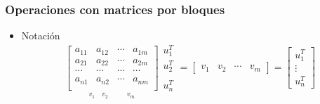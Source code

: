\subsubsection{Operaciones con matrices por bloques}
\begin{itemize}[label=\color{lightblue}$-$, leftmargin=*]
	\item Notación \[ \underset{\begin{array}{cccc}
			v_1~ & v_2 & ~~~ & ~~v_m
	\end{array}}{\left[\begin{array}{cccc}
	a_{11} & a_{12} & \cdots & a_{1m}\\
	a_{21} & a_{22} & \cdots & a_{2m}\\
	\cdots & \cdots & \cdots & \cdots\\
	a_{n1} & a_{n2} & \cdots & a_{nm}\\
	\end{array}\right]}\begin{array}{c}
	u_1^T\\
	u_2^T\\
	\\
	u_n^T
\end{array}=\begin{bmatrix}
v_1 & v_2 & \cdots & v_m
\end{bmatrix}=\begin{bmatrix}
u_1^T\\
\vdots\\
u_n^T
\end{bmatrix}\]
	

\end{itemize}
